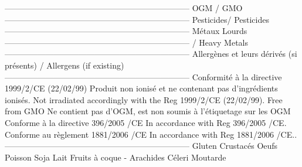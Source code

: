 -------------------------------------------------------------------- \newline OGM /  GMO \newline -------------------------------------------------------------------- \newline Pesticides/  Pesticides \newline -------------------------------------------------------------------- \newline Métaux Lourds \newline -------------------------------------------------------------------- \newline /  Heavy Metals \newline -------------------------------------------------------------------- \newline Allergènes et leurs dérivés (si présents) \newline /  Allergens (if existing) \newline -------------------------------------------------------------------- \newline Conformité à la directive 1999/2/CE (22/02/99)  \newline Produit non ionisé et ne contenant pas d’ingrédients ionisés.  \newline Not irradiated  \newline accordingly with the Reg 1999/2/CE (22/02/99). \newline Free from GMO \newline Ne contient pas d’OGM, est non soumis à l’étiquetage sur les OGM  \newline Conforme à la directive 396/2005 /CE  \newline In accordance with Reg 396/2005 /CE. \newline Conforme au règlement 1881/2006 /CE   \newline In accordance with Reg 1881/2006 /CE.. \newline -------------------------------------------------------------------- \newline Gluten \newline Crustacés \newline Oeufs \newline Poisson \newline Soja \newline Lait \newline Fruits à coque - Arachides \newline Céleri \newline Moutarde 